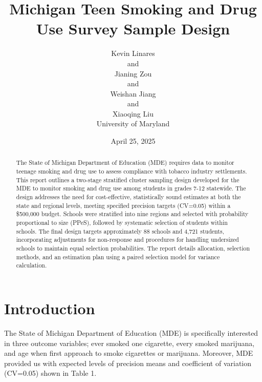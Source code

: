 \documentclass[
  12pt]{article}
\begin{document}
\def\spacingset#1{\renewcommand{\baselinestretch}%
{#1}\small\normalsize} \spacingset{1}



\date{April 25, 2025}
\title{\bf Michigan Teen Smoking and Drug Use Survey Sample Design}
\author{
Kevin Linares\\
and\\Jianing Zou\\
and\\Weishan Jiang\\
and\\Xiaoqing Liu\\
University of Maryland\\
}
\maketitle

\bigskip
\bigskip
\begin{abstract}
The State of Michigan Department of Education (MDE) requires data to
monitor teenage smoking and drug use to assess compliance with tobacco
industry settlements. This report outlines a two-stage stratified
cluster sampling design developed for the MDE to monitor smoking and
drug use among students in grades 7-12 statewide. The design addresses
the need for cost-effective, statistically sound estimates at both the
state and regional levels, meeting specified precision targets (CV=0.05)
within a \$500,000 budget. Schools were stratified into nine regions and
selected with probability proportional to size (PPeS), followed by
systematic selection of students within schools. The final design
targets approximately 88 schools and 4,721 students, incorporating
adjustments for non-response and procedures for handling undersized
schools to maintain equal selection probabilities. The report details
allocation, selection methods, and an estimation plan using a paired
selection model for variance calculation.
\end{abstract}


\newpage
\spacingset{1.9} %


\section{Introduction}\label{sec-intro}

The State of Michigan Department of Education (MDE) is specifically
interested in three outcome variables; ever smoked one cigarette, every
smoked marijuana, and age when first approach to smoke cigarettes or
marijuana. Moreover, MDE provided us with expected levels of precision
means and coefficient of variation (CV=0.05) shown in Table 1.
\end{document}
